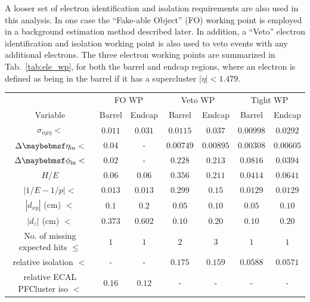 A looser set of electron identification and isolation requirements are also used in this analysis. In one case the ``Fake-able Object'' (FO) working point is employed in a background estimation method described later. In addition, a ``Veto'' electron identification and isolation working point is also used to veto events with any additional electrons. The three electron working points are summarized in Tab.~\ref{tab:ele_wp}, for both the barrel and endcap regions, where an electron is defined as being in the barrel if it has a supercluster $|\eta|<1.479$.

\begin{table}[!ht]
\centering
\begin{tabular}{|c|c|c|c|c|c|c|}
\hline
  & \multicolumn{2}{c|}{FO WP} & \multicolumn{2}{c|}{Veto WP} & \multicolumn{2}{c|}{Tight WP} \\
  Variable                                      & Barrel    & Endcap   & Barrel    & Endcap    & Barrel    & Endcap     \\
\hline
  $\sigma_{i\eta i\eta} <$                      & $0.011$   & $0.031$  & $0.0115$  & $0.037$   & $0.00998$ & $0.0292$ \\
  $\Delta\eta_{\mbox{\scriptsize{in}}} <$       & $0.04$    &  -       & $0.00749$ & $0.00895$ & $0.00308$ & $0.00605$\\ 
  $\Delta\phi_{\mbox{\scriptsize{in}}} <$       & $0.02$    &  -       & $0.228$   & $0.213$   & $0.0816$  & $0.0394$ \\
  $H/E$                                         & $0.06$    & $0.06$   & $0.356$   & $0.211$   & $0.0414$  & $0.0641$ \\
  $|1/E - 1/p| <$                               & $0.013$    & $0.013$   & $0.299$   & $0.15$    & $0.0129$  & $0.0129$ \\
  $|d_{xy}|$ (cm) $<$                              & $0.1$     & $0.2$    & $0.05$    & $0.10$    & $0.05$    & $0.10$   \\
  $|d_z|$ (cm) $<$                              & $0.373$   & $0.602$  & $0.10$    & $0.20$    & $0.10$    & $0.20$   \\
  No. of missing expected hits $\leq$           & $1$       & $1$      & $2$       & $3$       & $1$       & $1$      \\
  relative isolation $<$                        & -         & -        & $0.175$   & $0.159$   & $0.0588$  & $0.0571$ \\
  relative ECAL PFCluster iso $<$               & $0.16$    & $0.12$   & -         & -         & -         & - \\

\end{tabular}
\end{table}
